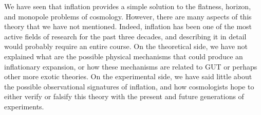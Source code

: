 \documentclass[11pt, a4paper,oneside,openright]{book}
\numberwithin{equation}{section}
\begin{document}
We have seen that inflation provides a simple solution to the flatness, horizon, and monopole problems of cosmology. However, there are many aspects of this theory that we have not mentioned. Indeed, inflation has been one of the most active fields of research for the past three decades, and describing it in detail would probably require an entire course. On the theoretical side, we have not explained what are the possible physical mechanisms that could produce an inflationary expansion, or how these mechanisms are related to GUT or perhaps other more exotic theories. On the experimental side, we have said little about the possible observational signatures of inflation, and how cosmologists hope to either verify or falsify this theory with the present and future generations of experiments.


\begin{thebibliography}{99}
\end{thebibliography}
\end{document}
